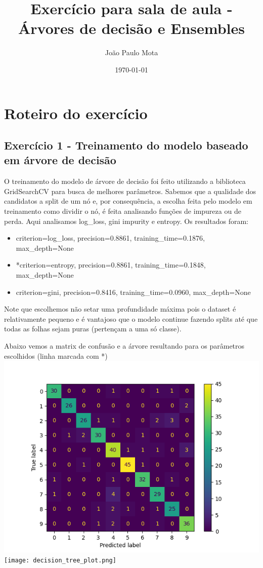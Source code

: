 \documentclass[11pt]{article}
\title{Exercício para sala de aula - Árvores de decisão e Ensembles}
\author{ João Paulo Mota }
\date{\today}
\begin{document}
\maketitle



\section{Roteiro do exercício}

\subsection{Exercício 1 - Treinamento do modelo baseado em árvore de decisão}
O treinamento do modelo de árvore de decisão foi feito utilizando a biblioteca GridSearchCV para busca de melhores parâmetros.
Sabemos que a qualidade dos candidatos a split de um nó e, por consequência, a escolha feita pelo modelo em treinamento  como dividir o nó, é feita analisando 
funções de impureza ou de perda.
Aqui analisamos log\_loss, gini impurity e entropy. Os resultados foram:

\begin{itemize}
  \item criterion=log\_loss, precision=0.8861, training\_time=0.1876, max\_depth=None
  \item *criterion=entropy, precision=0.8861, training\_time=0.1848, max\_depth=None
  \item criterion=gini, precision=0.8416, training\_time=0.0960, max\_depth=None
\end{itemize}

Note que escolhemos não setar uma profundidade máxima pois o dataset é relativamente pequeno e é vantajoso que o modelo continue fazendo splits até que todas as folhas sejam puras (pertençam a uma só classe).

Abaixo vemos a matrix de confusão e a árvore resultando para os parâmetros escolhidos (linha marcada com *)
\\
\centering
\includegraphics[height=0.28\textheight]{decision_tree_confusion_matrix.png}
\\
\centering
\texttt{[image: decision\_tree\_plot.png]}
\end{document}
